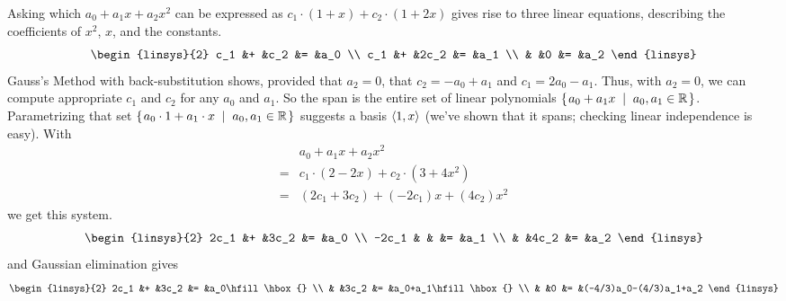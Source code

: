 \begin{Answer}
\Question Asking which $a_0+a_1x+a_2x^2$ can be expressed as
           $c_1\cdot (1+x)+c_2\cdot (1+2x)$ 
           gives rise to three linear equations,
           describing the coefficients of $x^2$, $x$, and the constants.
           \begin{equation*} 
             \begin{linsys}{2}
               c_1 &+ &c_2  &= &a_0 \\
               c_1 &+ &2c_2 &= &a_1 \\
                   &  &0    &= &a_2
             \end{linsys}
           \end{equation*}
           Gauss's Method with back-substitution shows, 
           provided that $a_2=0$, that $c_2=-a_0+a_1$
           and $c_1=2a_0-a_1$.
           Thus, with $a_2=0$, we can compute appropriate
           $c_1$ and $c_2$ for any $a_0$ and $a_1$.
           So the span is the entire set of linear polynomials
           $\mbox{$\left\{\hspace{0.1em}a_0+a_1x\;\;\middle|\;\; a_0,a_1\in\mathbb{R}\hspace{0.1em}\right\}$}$.
           Parametrizing that set 
           $\mbox{$\left\{\hspace{0.1em}a_0\cdot 1+a_1\cdot x\;\;\middle|\;\; a_0,a_1\in\mathbb{R}\hspace{0.1em}\right\}$}$
           suggests a basis $\langle1,x\rangle$ 
           (we've shown that it spans; checking linear independence is easy). 
\Question With
          \begin{align*}
            &a_0+a_1x+a_2x^2\\
            =&c_1\cdot(2-2x)+c_2\cdot(3+4x^2)\\
            =&(2c_1+3c_2)+(-2c_1)x+(4c_2)x^2
          \end{align*}
          we get this system.
           \begin{equation*} 
             \begin{linsys}{2}
               2c_1  &+ &3c_2  &= &a_0 \\
               -2c_1 &  &      &= &a_1 \\
                     &  &4c_2  &= &a_2
              \end{linsys}
	\end{equation*}
	and Gaussian elimination gives
        \begin{equation*}     
	\begin{linsys}{2}
               2c_1  &+ &3c_2  &= &a_0\hfill\hbox{} \\
                     &  &3c_2  &= &a_0+a_1\hfill\hbox{} \\
                     &  &0     &= &(-4/3)a_0-(4/3)a_1+a_2

\end{linsys}
\end{equation*}
\end{Answer}
